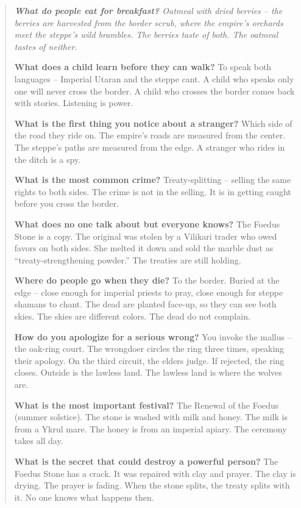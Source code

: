 \documentclass[12pt,oneside]{book}
\newenvironment{almanac}
  {\begin{quote}\small\itshape}
  {\end{quote}}
\begin{document}
\vspace{1em}
\begin{almanac}
\textbf{What do people eat for breakfast?} Oatmeal with dried berries -- the berries are harvested from the border scrub, where the empire's orchards meet the steppe's wild brambles. The berries taste of both. The oatmeal tastes of neither.

\textbf{What does a child learn before they can walk?} To speak both languages -- Imperial Utaran and the steppe cant. A child who speaks only one will never cross the border. A child who crosses the border comes back with stories. Listening is power.

\textbf{What is the first thing you notice about a stranger?} Which side of the road they ride on. The empire's roads are measured from the center. The steppe's paths are measured from the edge. A stranger who rides in the ditch is a spy.

\textbf{What is the most common crime?} Treaty-splitting -- selling the same rights to both sides. The crime is not in the selling. It is in getting caught before you cross the border.

\textbf{What does no one talk about but everyone knows?} The Foedus Stone is a copy. The original was stolen by a Vilikari trader who owed favors on both sides. She melted it down and sold the marble dust as ``treaty-strengthening powder.'' The treaties are still holding.

\textbf{Where do people go when they die?} To the border. Buried at the edge -- close enough for imperial priests to pray, close enough for steppe shamans to chant. The dead are planted face-up, so they can see both skies. The skies are different colors. The dead do not complain.

\textbf{How do you apologize for a serious wrong?} You invoke the mallus -- the oak-ring court. The wrongdoer circles the ring three times, speaking their apology. On the third circuit, the elders judge. If rejected, the ring closes. Outside is the lawless land. The lawless land is where the wolves are.

\textbf{What is the most important festival?} The Renewal of the Foedus (summer solstice). The stone is washed with milk and honey. The milk is from a Ykrul mare. The honey is from an imperial apiary. The ceremony takes all day.

\textbf{What is the secret that could destroy a powerful person?} The Foedus Stone has a crack. It was repaired with clay and prayer. The clay is drying. The prayer is fading. When the stone splits, the treaty splits with it. No one knows what happens then.
\end{almanac}
\end{document}
